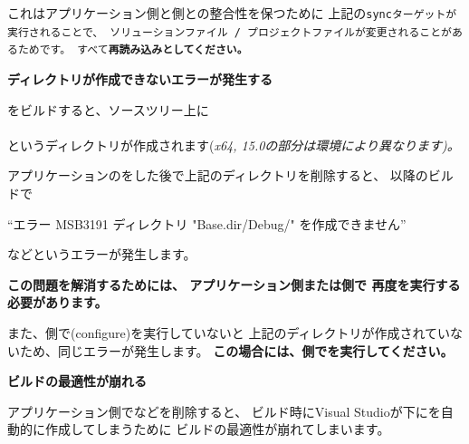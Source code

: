 \medskip
これはアプリケーション側と\SprLib 側との整合性を保つために
上記の\tt{sync}ターゲットが実行されることで、
ソリューションファイル / プロジェクトファイルが変更されることがあるためです。
すべて\bf{再読み込み}としてください。


\thinrule{\linewidth}
\bf{ディレクトリが作成できないエラーが発生する}

\medskip
\SprLib をビルドすると、ソースツリー上に\\
\hspace{10pt} \\
というディレクトリが作成されます(\it{x64}, \it{15.0}の部分は環境により異なります)。

アプリケーションの\cmake をした後で上記のディレクトリを削除すると、
以降のビルドで

\hspace{20pt}``エラー MSB3191 ディレクトリ "Base.dir/Debug/" を作成できません''

などというエラーが発生します。

\bf{この問題を解消するためには、
アプリケーション側または\SprLib 側で 再度\cmake を実行する必要があります。}

また、\SprLib 側で\cmake (configure)を実行していないと 
上記のディレクトリが作成されていないため、同じエラーが発生します。
\bf{この場合には、\SprLib 側で\cmake を実行してください。}

\thinrule{\linewidth}
\bf{ビルドの最適性が崩れる}
\label{subsec:QandA:CrumbleBuildOptimizeation}

\medskip
アプリケーション側でなどを削除すると、
ビルド時にVisual Studioが\BldDir 下にを自動的に作成してしまうために
ビルドの最適性が崩れてしまいます。



